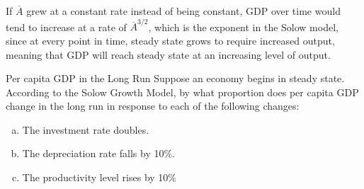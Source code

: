 \documentclass[8pt]{extarticle}
\begin{document}
\begin{solution}
\begin{tcolorbox}[title = (b), colback = white, breakable]
\begin{center}
  \end{center}
  \end{tcolorbox}
  \begin{tcolorbox}[title = (c), colback = white, breakable]
    If $\overline{A}$ grew at a constant rate instead of being constant, GDP over time would tend to increase at a rate of $\overline{A}^{3/2}$, which is the exponent in the Solow model, since at every point in time, steady state grows to require increased output, meaning that GDP will reach steady state at an increasing level of output.
  \end{tcolorbox}
\end{solution}
\begin{problem}{Per capita GDP in the Long Run}
  Suppose an economy begins in steady state. According to the Solow Growth Model, by what proportion does per capita GDP change in the long run in response to each of the following changes:
  \begin{enumerate}[(a)]
    \item The investment rate doubles.
    \item The depreciation rate falls by 10\%.
    \item The productivity level rises by 10\%
  \end{enumerate}
\end{problem}
\end{document}
